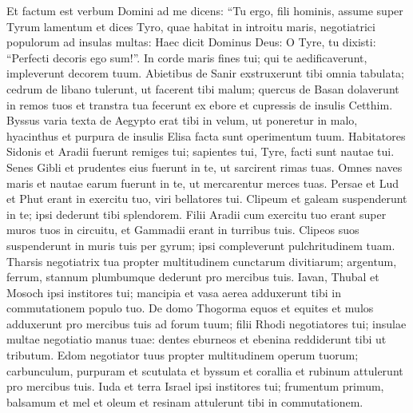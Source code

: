 \begin{biblechapter}
\begin{biblechapter}
\begin{biblechapter}
\begin{biblechapter}
\begin{biblechapter}
\begin{biblechapter}
\begin{biblechapter}
\begin{biblechapter}
\begin{biblechapter}
\begin{biblechapter}
\begin{biblechapter}
\begin{biblechapter}
\begin{biblechapter}
\begin{biblechapter}
\begin{biblechapter}
\begin{biblechapter}
\begin{biblechapter}
\begin{biblechapter}
\begin{biblechapter}
\begin{biblechapter}
\begin{biblechapter}
\begin{biblechapter}
\begin{biblechapter}
\begin{biblechapter}
\begin{biblechapter}
\begin{biblechapter}
\begin{biblechapter}
\verse Et factum est verbum Domini ad me dicens: 
\verse “Tu ergo, fili hominis, assume super Tyrum lamentum 
\verse et dices Tyro, quae habitat in introitu maris, negotiatrici populorum ad insulas multas: Haec dicit Dominus Deus:
 O Tyre, tu dixisti: “Perfecti decoris ego sum!”.
 \verse In corde maris fines tui;
 qui te aedificaverunt, impleverunt decorem tuum.
 \verse Abietibus de Sanir exstruxerunt
 tibi omnia tabulata;
 cedrum de libano tulerunt,
 ut facerent tibi malum;
 \verse quercus de Basan
 dolaverunt in remos tuos
 et transtra tua fecerunt ex ebore
 et cupressis de insulis Cetthim.
 \verse Byssus varia texta de Aegypto
 erat tibi in velum,
 ut poneretur in malo,
 hyacinthus et purpura de insulis Elisa
 facta sunt operimentum tuum.
 \verse Habitatores Sidonis et Aradii
 fuerunt remiges tui;
 sapientes tui, Tyre,
 facti sunt nautae tui.
 \verse Senes Gibli et prudentes eius fuerunt in te,
 ut sarcirent rimas tuas.
 Omnes naves maris et nautae earum
 fuerunt in te, ut mercarentur merces tuas.
 \verse Persae et Lud et Phut
 erant in exercitu tuo,
 viri bellatores tui.
 Clipeum et galeam suspenderunt in te;
 ipsi dederunt tibi splendorem.
 \verse Filii Aradii cum exercitu tuo erant super muros tuos in circuitu, et Gammadii erant in turribus tuis. Clipeos suos suspenderunt in muris tuis per gyrum; ipsi compleverunt pulchritudinem tuam. 
\verse Tharsis negotiatrix tua propter multitudinem cunctarum divitiarum; argentum, ferrum, stannum plumbumque dederunt pro mercibus tuis. 
\verse Iavan, Thubal et Mosoch ipsi institores tui; mancipia et vasa aerea adduxerunt tibi in commutationem populo tuo. 
\verse De domo Thogorma equos et equites et mulos adduxerunt pro mercibus tuis ad forum tuum; 
 \verse filii Rhodi negotiatores tui; insulae multae negotiatio manus tuae: dentes eburneos et ebenina reddiderunt tibi ut tributum. 
\verse Edom negotiator tuus propter multitudinem operum tuorum; carbunculum, purpuram et scutulata et byssum et corallia et rubinum attulerunt pro mercibus tuis. 
\verse Iuda et terra Israel ipsi institores tui; frumentum primum, balsamum et mel et oleum et resinam attulerunt tibi in commutationem. 

\end{biblechapter}
\end{biblechapter}
\end{biblechapter}
\end{biblechapter}
\end{biblechapter}
\end{biblechapter}
\end{biblechapter}
\end{biblechapter}
\end{biblechapter}
\end{biblechapter}
\end{biblechapter}
\end{biblechapter}
\end{biblechapter}
\end{biblechapter}
\end{biblechapter}
\end{biblechapter}
\end{biblechapter}
\end{biblechapter}
\end{biblechapter}
\end{biblechapter}
\end{biblechapter}
\end{biblechapter}
\end{biblechapter}
\end{biblechapter}
\end{biblechapter}
\end{biblechapter}
\end{biblechapter}

